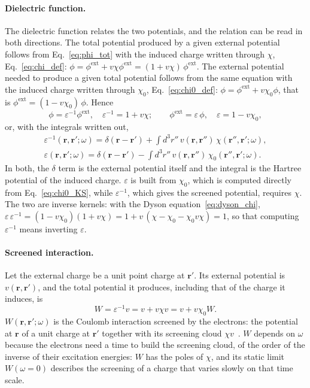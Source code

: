 \documentclass[10pt,a4paper]{paper}
\begin{document}
\paragraph{Dielectric function.} The dielectric function relates the two potentials, and the relation can be read in
both directions. The total potential produced by a given external potential follows from Eq.~\eqref{eq:phi_tot} with
the induced charge written through $\chi$, Eq.~\eqref{eq:chi_def}: $\phi = \phi^{\mathrm{ext}} + v\chi\phi^{\mathrm{ext}}
= (1 + v\chi)\,\phi^{\mathrm{ext}}$. The external potential needed to produce a given total potential follows from the
same equation with the induced charge written through $\chi_0$, Eq.~\eqref{eq:chi0_def}:
$\phi = \phi^{\mathrm{ext}} + v\chi_0\phi$, that is $\phi^{\mathrm{ext}} = (1 - v\chi_0)\,\phi$. Hence
\begin{equation}
\phi = \varepsilon^{-1}\phi^{\mathrm{ext}} , \quad \varepsilon^{-1} = 1 + v\chi ; \qquad
\phi^{\mathrm{ext}} = \varepsilon\,\phi , \quad \varepsilon = 1 - v\chi_0 ,
\label{eq:eps}
\end{equation}
or, with the integrals written out,
\begin{gather*}
\varepsilon^{-1}(\bm{r},\bm{r}';\omega) = \delta(\bm{r} - \bm{r}') + \int d^3r''\,v(\bm{r},\bm{r}'')\,\chi(\bm{r}'',\bm{r}';\omega) ,
\\
\varepsilon(\bm{r},\bm{r}';\omega) = \delta(\bm{r} - \bm{r}') - \int d^3r''\,v(\bm{r},\bm{r}'')\,\chi_0(\bm{r}'',\bm{r}';\omega) .
\end{gather*}
In both, the $\delta$ term is the external potential itself and the integral is the Hartree potential of the induced
charge. $\varepsilon$ is built from $\chi_0$, which is computed directly from Eq.~\eqref{eq:chi0_KS}, while
$\varepsilon^{-1}$, which gives the screened potential, requires $\chi$. The two are inverse kernels: with the Dyson
equation~\eqref{eq:dyson_chi},
$\varepsilon\,\varepsilon^{-1} = (1 - v\chi_0)(1 + v\chi) = 1 + v\,(\chi - \chi_0 - \chi_0v\chi) = 1$, so that
computing $\varepsilon^{-1}$ means inverting $\varepsilon$. 

\paragraph{Screened interaction.} Let the external charge be a unit point charge at $\bm{r}'$. Its external potential
is $v(\bm{r},\bm{r}')$, and the total potential it produces, including that of the charge it induces, is
\begin{equation}
W = \varepsilon^{-1}v = v + v\chi v = v + v\chi_0 W .
\label{eq:W}
\end{equation}
$W(\bm{r},\bm{r}';\omega)$ is the Coulomb interaction screened by the electrons: the potential at $\bm{r}$ of a unit
charge at $\bm{r}'$ together with its screening cloud $\chi v$~\cite{blase2018introduction}. 
$W$ depends on $\omega$ because the electrons need a time to build the screening cloud, of the order of the inverse of 
their excitation energies: $W$ has the poles of $\chi$, and its static limit $W(\omega = 0)$ describes the screening 
of a charge that varies slowly on that time scale.
\end{document}
